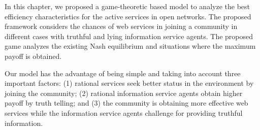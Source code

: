 In this chapter, we proposed a game-theoretic based model to analyze the best efficiency characteristics for the active services in open networks. The proposed framework considers the chances of web services in joining a community in different cases with truthful and lying information service agents. The proposed game analyzes the existing Nash equilibrium and situations where the maximum payoff is obtained.

Our model has the advantage of being simple and taking into account three important factors: (1) rational services seek better status in the environment by joining the community; (2) rational information service agents obtain higher payoff by truth telling; and (3) the community is obtaining more effective web services while the information service agents challenge for providing truthful information. 
